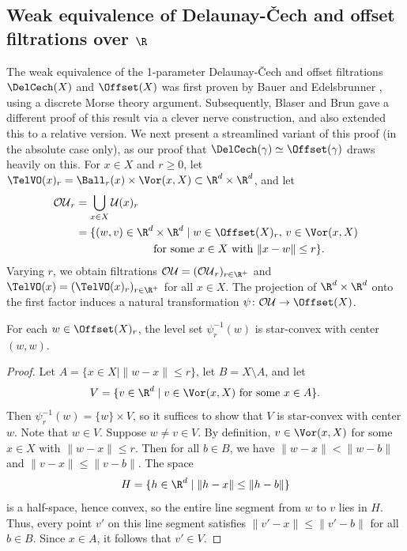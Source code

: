 \subsection{Weak equivalence of Delaunay-\v Cech and offset filtrations over $\R$}\label{Sec:WE_DelCech_1_param}
The weak equivalence of the 1-parameter Delaunay-\v Cech and offset filtrations $\DelCech(X)$ and $\Offset(X)$ was first proven by Bauer and Edelsbrunner \cite{bauer2017morse}, using a discrete Morse theory argument.  Subsequently, Blaser and Brun \cite{blaser2022relative} gave a different proof of this result via a clever nerve construction, and also extended this to a relative version.  We next present a streamlined variant of this proof (in the absolute case only), as our proof that $\DelCech(\gamma)\simeq \Offset(\gamma)$ draws heavily on this.
%
For $x\in X$ and $r\geq 0$, let $\TelVO(x)_r= \Ball_r(x) \times \Vor(x,X)\subset \R^d\times \R^d$, and let 
\begin{align*}
\mathcal{OU}_r &= \bigcup_{x\in X} \mathcal{U}(x)_r \\
               &= \{(w,v)\in \R^d\times \R^d \mid w\in \Offset(X)_r,\, v\in \Vor(x,X) \\
               &\phantom{{}= \qquad \qquad \qquad} \textup{for some }x\in X\textup{ with }\|x-w\|\leq r\}.
\end{align*}
Varying $r$, we obtain filtrations $\mathcal{OU}=(\mathcal{OU}_r)_{r\in \R^+}$ and $\TelVO(x)=(\TelVO(x)_r)_{r\in \R^+}$ for all  $x\in X$.  
The projection of $\R^d\times \R^d$ onto the first factor induces a natural transformation $\psi\colon \mathcal{OU}\to \Offset(X)$.
%
\begin{lemma}\label{Lem:Star_Convex}
For each $w\in \Offset(X)_r$, the level set $\psi^{-1}_r(w)$ is star-convex with center $(w,w)$.  
\end{lemma}
%
\begin{proof}
Let $A=\{x\in X\mid \|w-x\|\leq r\}$, let $B=X\setminus A$, and let \[V=\{v\in \R^d \mid v\in \Vor(x,X)\textup{ for some }x\in A\}.\]
  Then $\psi^{-1}_r(w)=\{w\}\times V$, so it suffices to show that $V$ is star-convex with center $w$.  Note that $w\in V$.  Suppose $w\ne v\in V$.   By definition, $v\in \Vor(x,X)$ for some $x\in X$ with $\|w-x\|\leq r$. Then for all $b\in B$, we have $\|w-x\|<\|w-b\|$ and $\|v-x\|\leq \|v-b\|$.  The space 
 \[H=\{h\in \R^d\mid \|h-x\|\leq \|h-b\|\}\] is a half-space, hence convex, so the entire line segment from $w$ to $v$ lies in $H$.  Thus, every point $v'$ on this line segment satisfies $\|v'-x\|\leq \|v'-b\|$ for all $b\in B$.  Since $x\in A$, it follows that $v'\in V$.  
\end{proof}
